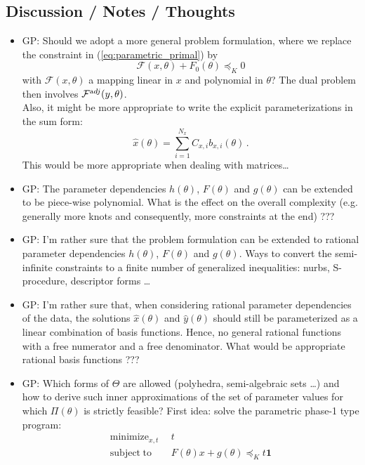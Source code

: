 \documentclass{article}
\newcommand{\ppar}{\theta}                  %
\newcommand{\Ppar}{\Theta}                  %
\DeclareMathOperator*{\minimize}{minimize}
\DeclareMathOperator*{\subj}{subject\;to}
\begin{document}
\subsection{Discussion / Notes / Thoughts}
\begin{itemize}
\item GP: Should we adopt a more general problem formulation, where we replace the constraint in (\ref{eq:parametric_primal}) by
    \[ \mathcal{F}(x,\ppar) + F_0(\ppar) \preceq_K 0
    \]
    with $\mathcal{F}(x,\ppar)$ a mapping linear in $x$ and polynomial in $\ppar$? The dual problem then involves $\mathcal{F}^{\text adj}(y,\ppar)$.\\ Also, it might be more appropriate to write the explicit parameterizations in the sum form:
    \[ \hat{x}(\ppar) = \sum_{i=1}^{N_x} C_{x,i}b_{x,i}(\ppar)\,.
    \]
    This would be more appropriate when dealing with matrices\ldots
\item GP: The parameter dependencies $h(\ppar)$, $F(\ppar)$ and $g(\ppar)$ can be extended to be piece-wise polynomial. What is the effect on the overall complexity (e.g. generally more knots and consequently, more constraints at the end) ???
\item GP: I'm rather sure that the problem formulation can be extended to rational parameter dependencies $h(\ppar)$, $F(\ppar)$ and $g(\ppar)$. Ways to convert the semi-infinite constraints to a finite number of generalized inequalities: nurbs, S-procedure, descriptor forms \ldots
\item GP: I'm rather sure that, when considering rational parameter dependencies of the data, the solutions $\hat{x}(\ppar)$ and $\hat{y}(\ppar)$ should still be parameterized as a linear combination of basis functions. Hence, no general rational functions with a free numerator and a free denominator. What would be appropriate rational basis functions ???
\item GP: Which forms of $\Ppar$ are allowed (polyhedra, semi-algebraic sets \ldots) and how to derive such inner approximations of the set of parameter values for which $\Pi(\ppar)$ is strictly feasible? First idea: solve the parametric phase-1 type program:
    \begin{align*}
    \minimize_{x,t} &~~ t\\
    \subj           &~~ F(\ppar)x+g(\ppar)\preceq_K t \bm{1}
    \end{align*}
\end{itemize}


\end{document}
